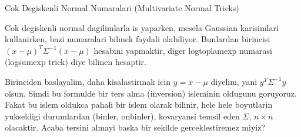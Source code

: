 \documentclass[12pt,fleqn]{article}\usepackage{../common}
\begin{document}
Cok Degiskenli Normal Numaralari  (Multivariate Normal Tricks)

Cok degiskenli normal dagilimlarla is yaparken, mesela Gaussian karisimlari
kullanirken, bazi numaralari bilmek faydali olabiliyor. Bunlardan birincisi
$(x-\mu)^T\Sigma^{-1}(x-\mu)$ hesabini yapmaktir, diger logtoplamexp
numarasi (logsumexp trick) diye bilinen hesaptir.

Birinciden baslayalim, daha kisalastirmak icin $y=x-\mu$ diyelim, yani
$y^T\Sigma^{-1}y$ olsun. Simdi bu formulde bir ters alma (inversion)
isleminin oldugunu goruyoruz. Fakat bu islem oldukca pahali bir islem
olarak bilinir, hele hele boyutlarin yukseldigi durumlardan (binler,
onbinler), kovaryansi temsil eden $\Sigma$, $n \times n$ olacaktir. Acaba
tersini almayi baska bir sekilde gerceklestiremez miyiz?
\end{document}
